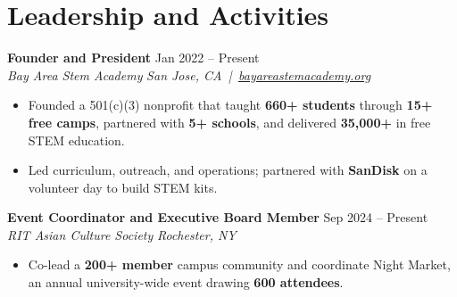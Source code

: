 \documentclass[10pt,letterpaper]{article}
\newif\ifresumeFirstRole
\newcommand{\resumeRole}[4]{%
  \ifresumeFirstRole
    \global\resumeFirstRolefalse
  \else
    \vspace{0pt plus 1fill}%
  \fi
  \textbf{#1} \hfill #2\\
  \textit{#3} \hfill \textit{#4}
}
\begin{document}
\section*{Leadership and Activities}
\resumeRole{Founder and President}{Jan 2022 -- Present}{Bay Area Stem Academy}{San Jose, CA \,|\, \href{https://bayareastemacademy.org}{bayareastemacademy.org}}
\begin{itemize}
  \item Founded a 501(c)(3) nonprofit that taught \textbf{660+ students} through \textbf{15+ free camps}, partnered with \textbf{5+ schools}, and delivered \textbf{\textdollar{}35,000+} in free STEM education.
  \item Led curriculum, outreach, and operations; partnered with \textbf{SanDisk} on a volunteer day to build STEM kits.
\end{itemize}

\resumeRole{Event Coordinator and Executive Board Member}{Sep 2024 -- Present}{RIT Asian Culture Society}{Rochester, NY}
\begin{itemize}
  \item Co-lead a \textbf{200+ member} campus community and coordinate Night Market, an annual university-wide event drawing \textbf{600 attendees}.
\end{itemize}
\end{document}
